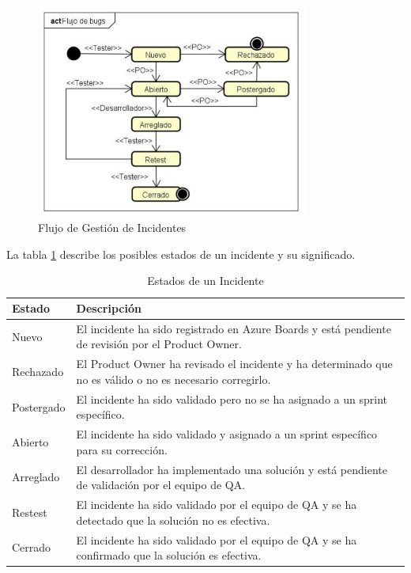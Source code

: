 \begin{figure}[H]
    \centering
    \includegraphics[width=0.8\textwidth]{../imagenes/secciones/8-Gestion-de-la-Calidad/Flujo gestion de incidentes.jpg}
    \caption{Flujo de Gestión de Incidentes}
    \label{fig:flujoIncidentes}
\end{figure}

La tabla \ref{tab:estadosIncidentes} describe los posibles estados de un incidente y su significado.

\begin{table}[H]
    \centering
    \begin{tabular}{p{3cm} p{10cm}}
    \hline
    \textbf{Estado} & \textbf{Descripción} \\ \hline
    Nuevo & El incidente ha sido registrado en Azure Boards y está pendiente de revisión por el Product Owner. \\ \hline
    Rechazado & El Product Owner ha revisado el incidente y ha determinado que no es válido o no es necesario corregirlo. \\ \hline
    Postergado & El incidente ha sido validado pero no se ha asignado a un sprint específico. \\ \hline
    Abierto & El incidente ha sido validado y asignado a un sprint específico para su corrección. \\ \hline
    Arreglado & El desarrollador ha implementado una solución y está pendiente de validación por el equipo de QA. \\ \hline
    Restest & El incidente ha sido validado por el equipo de QA y se ha detectado que la solución no es efectiva. \\ \hline
    Cerrado & El incidente ha sido validado por el equipo de QA y se ha confirmado que la solución es efectiva. \\ \hline
    \end{tabular}
    \caption{Estados de un Incidente}
    \label{tab:estadosIncidentes}
\end{table}

